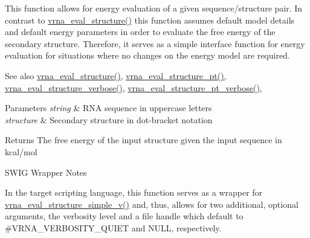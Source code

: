 This function allows for energy evaluation of a given sequence/structure pair. In contrast to \hyperlink{group__eval_ga58f199f1438d794a265f3b27fc8ea631}{vrna\+\_\+eval\+\_\+structure()} this function assumes default model details and default energy parameters in order to evaluate the free energy of the secondary structure. Therefore, it serves as a simple interface function for energy evaluation for situations where no changes on the energy model are required.

\begin{DoxySeeAlso}{See also}
\hyperlink{group__eval_ga58f199f1438d794a265f3b27fc8ea631}{vrna\+\_\+eval\+\_\+structure()}, \hyperlink{group__eval_gadbd09372ddfd7a450bbd590c96a6bfe4}{vrna\+\_\+eval\+\_\+structure\+\_\+pt()}, \hyperlink{group__eval_ga0928d699d310178f84ee2351034e5cb5}{vrna\+\_\+eval\+\_\+structure\+\_\+verbose()}, \hyperlink{group__eval_ga8a517cfeeae8c376ae7b1e0c401d38b4}{vrna\+\_\+eval\+\_\+structure\+\_\+pt\+\_\+verbose()},
\end{DoxySeeAlso}

\begin{DoxyParams}{Parameters}
{\em string} & R\+NA sequence in uppercase letters \\
\hline
{\em structure} & Secondary structure in dot-\/bracket notation \\
\hline
\end{DoxyParams}
\begin{DoxyReturn}{Returns}
The free energy of the input structure given the input sequence in kcal/mol
\end{DoxyReturn}
\begin{DoxyRefDesc}{S\+W\+I\+G Wrapper Notes}
\item[\hyperlink{wrappers__wrappers000035}{S\+W\+I\+G Wrapper Notes}]In the target scripting language, this function serves as a wrapper for \hyperlink{group__eval_gacd6278343e77d13f1d53588e50d303bc}{vrna\+\_\+eval\+\_\+structure\+\_\+simple\+\_\+v()} and, thus, allows for two additional, optional arguments, the verbosity level and a file handle which default to \#\+V\+R\+N\+A\+\_\+\+V\+E\+R\+B\+O\+S\+I\+T\+Y\+\_\+\+Q\+U\+I\+ET and N\+U\+LL, respectively. \end{DoxyRefDesc}
\mbox{\label{group__eval_ga3e05a23ddf9b083f4e69881e440d4866}} 
